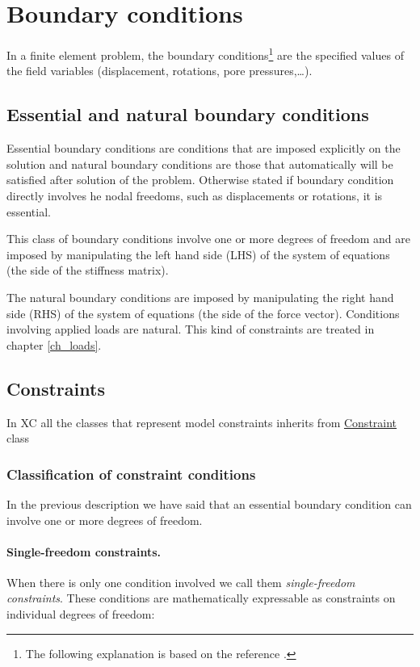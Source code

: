 \section{Boundary conditions}
In a finite element problem, the boundary conditions\footnote{The following explanation is based on the reference \cite{asen5007}.} are the specified values of the field variables (displacement, rotations, pore pressures,\ldots).

\subsection{Essential and natural boundary conditions}
Essential boundary conditions are conditions that are imposed explicitly on the solution and natural boundary conditions are those that automatically will be satisfied after solution of the problem. Otherwise stated if boundary condition directly involves he nodal freedoms, such as displacements or rotations, it is essential.

This class of boundary conditions involve one or more degrees of freedom and are imposed by manipulating the left hand side (LHS) of the system of equations (the side of the stiffness matrix).

The natural boundary conditions are imposed by manipulating the right hand side (RHS) of the system of equations (the side of the force vector). Conditions involving applied loads are natural. This kind of constraints are treated in chapter \ref{ch_loads}.

\subsection{Constraints}
In XC all the classes that represent model constraints inherits from \href{https://github.com/xcfem/xc/blob/master/src/domain/constraints/Constraint.h}{Constraint} class 

\subsubsection{Classification of constraint conditions}
In the previous  description we have said that an essential boundary condition can involve one or more degrees of freedom.

\paragraph{Single-freedom constraints.}
When there is only one condition involved we call them \emph{single-freedom constraints}. These conditions are mathematically expressable as constraints on individual degrees of freedom:

